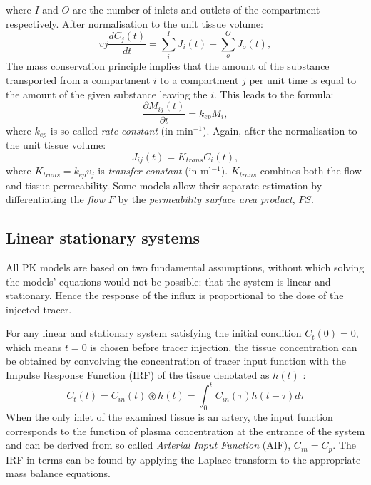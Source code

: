 where $I$ and $O$ are the number of inlets and outlets of the compartment respectively. 
After normalisation to the unit tissue volume:
\begin{equation}
vj\frac{dC_j(t)}{dt} = \sum_{i}^{I}J_i(t)-\sum_{o}^{O}J_o(t) ,
\label{eq:pk5}
\end{equation}
The mass conservation principle implies that the amount of the substance transported from a compartment $i$ to a compartment $j$ per unit time is equal to the amount of the given substance leaving the $i$. This leads to the formula:
\begin{equation}
\frac{\partial M_{ij}(t)}{\partial t} = k_{ep}M_i,
\label{eq:pk6}
\end{equation}
where $k_{ep}$ is so called \textit{rate constant} (in min$^{-1}$). Again, after the normalisation to the unit tissue volume:
\begin{equation}
J_{ij}(t) = K_{trans}C_i(t),
\label{eq:pk7}
\end{equation}
where $K_{trans}=k_{ep}v_j$ is \textit{transfer constant} (in ml$^{-1}$). $K_{trans}$ combines both the flow and tissue permeability. Some models allow their separate estimation by differentiating the \textit{flow} $F$ by the \textit{permeability surface area product}, $PS$. 

\subsection{Linear stationary systems}
All PK models are based on two fundamental assumptions, without which solving the models' equations would not be possible: that the system is linear and stationary. Hence the response of the influx is proportional to the dose of the injected tracer.  

For any linear and stationary system satisfying the 
initial condition $C_t(0) = 0$, which means $t = 0$ is chosen before tracer injection,
the tissue concentration can be obtained by convolving the concentration of tracer input function with the Impulse Response Function (IRF) of the tissue denotated as $h(t)$ \cite{sourbron2011scope}: 
\begin{equation}
	\label{eq:convolution}
	C_{t}(t) = C_{in}(t)\circledast h(t) = \int_{0}^{t}C_{in}(\tau)h(t-\tau)d\tau 
\end{equation}
When the only inlet of the examined tissue is an artery, the input function corresponds to the function of plasma concentration at the entrance of the system and can be derived from so called \textit{Arterial Input Function} (AIF), $C_{in} = C_{p}$. The IRF in terms can be found by applying the Laplace transform to the appropriate mass balance equations.

